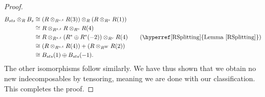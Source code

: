 \begin{proof}
\begin{align*}
B_{sts} \otimes_R B_s &\cong (R \otimes_{R^{s,t}} R(3)) \otimes_R (R \otimes_{R^s} R(1))\\
&\cong R \otimes_{R^{s,t}} R \otimes_{R^s} R(4)\\
&\cong R \otimes_{R^{s,t}} (R^s \oplus R^s(-2)) \otimes_{R^s} R(4) \tag*{(\hyperref[RSplitting]{Lemma \ref*{RSplitting}})}\\
&\cong (R \otimes_{R^{s,t}} R(4)) + (R \otimes_{R^W} R(2))\\
&\cong B_{sts}(1) \oplus B_{sts}(-1).
\end{align*}
\noindent The other isomorphisms follow similarly. We have thus shown that we obtain no new indecomposables by tensoring, meaning we are done with our classification. This completes the proof.
\end{proof}\\

